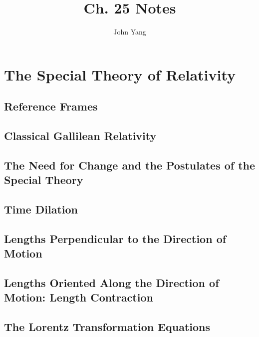 \documentclass[twocolumn]{article}
\title{Ch. 25 Notes}
\author{John Yang}
\begin{document}
\maketitle
\section{The Special Theory of Relativity}
\subsection{Reference Frames}
\begin{outline}
\1 
\end{outline}
\subsection{Classical Gallilean Relativity}
\begin{outline}
\1 
\end{outline}
\subsection{The Need for Change and the Postulates of the Special Theory}
\begin{outline}
\1 
\end{outline}
\subsection{Time Dilation}
\begin{outline}
\1 
\end{outline}
\subsection{Lengths Perpendicular to the Direction of Motion}
\begin{outline}
\1 
\end{outline}
\subsection{Lengths Oriented Along the Direction of Motion: Length Contraction}
\begin{outline}
\1 
\end{outline}
\subsection{The Lorentz Transformation Equations}
\begin{outline}
\1 
\end{outline}
\end{document}
